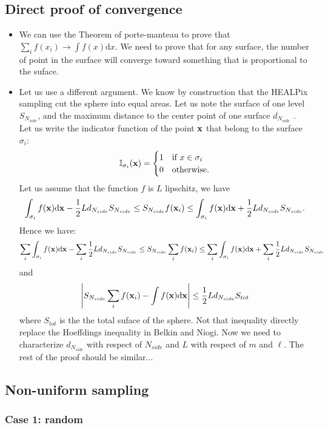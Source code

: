 \subsection*{Direct proof of convergence}
\begin{itemize}
	\item We can use the Theorem of porte-manteau to prove that $\sum_{i}f(x_{i})\rightarrow\int f(x)\text{d}x$.
	We need to prove that for any surface, the number of point in the surface will converge toward something that is proportional to the suface.
	\item Let us use a different argument. We know by construction that the
	HEALPix sampling cut the sphere into equal areas. Let us note the
	surface of one level $S_{N_{side}}$, and the maximum distance to
	the center point of one surface\textbf{ $d_{N_{side}}$} . Let us
	write the indicator function of the point ${\bf x}$ that belong to
	the surface $\sigma_{i}$: 
	\[
	\mathbb{I}_{\sigma_{i}}({\bf x})=\begin{cases}
	1 & \text{if }x\in\sigma_{i}\\
	0 & \text{otherwise.}
	\end{cases}
	\]
	Let us assume that the function $f$ is $L$ lipschitz, we have
	\[
	\int_{\sigma_{i}}f({\bf x})\text{d}{\bf x}-\frac{1}{2}Ld_{N_{side}}S_{N_{side}}\leq S_{N_{side}}f({\bf x}_{i})\leq\int_{\sigma_{i}}f({\bf x})\text{d}{\bf x}+\frac{1}{2}Ld_{N_{side}}S_{N_{side}}.
	\]
	Hence we have:
	\[
	\sum_{i}\int_{\sigma_{i}}f({\bf x})\text{d}{\bf x}-\sum_{i}\frac{1}{2}Ld_{N_{side}}S_{N_{side}}\leq S_{N_{side}}\sum_{i}f({\bf x}_{i})\leq\sum_{i}\int_{\sigma_{i}}f({\bf x})\text{d}{\bf x}+\sum_{i}\frac{1}{2}Ld_{N_{side}}S_{N_{side}}
	\]
	and 
	\[
	\left|S_{N_{side}}\sum_{i}f({\bf x}_{i})-\int f({\bf x})\text{d}{\bf x}\right|\le\frac{1}{2}Ld_{N_{side}}S_{tot}
	\]
	where $S_{tot}$ is the the total suface of the sphere. Not that inequality
	directly replace the Hoeffdings inequality in Belkin and Niogi. Now
	we need to characterize $d_{N_{side}}$ with respect of $N_{side}$
	and $L$ with respect of $m$ and $\ell$. The rest of the proof should
	be similar...
\end{itemize}

\subsection*{Non-uniform sampling}

\subsubsection*{Case 1: random}

